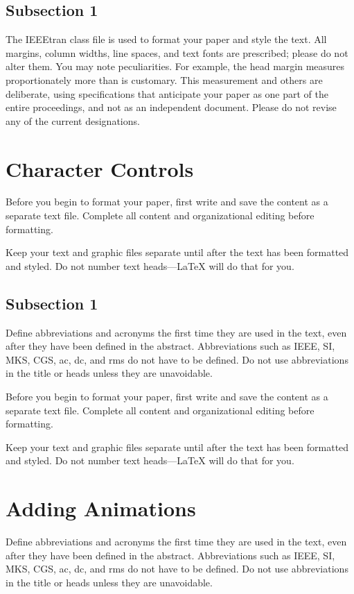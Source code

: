 \documentclass[conference]{IEEEtran}
\begin{document}
\subsection{Subsection 1}

The IEEEtran class file is used to format your paper and style the text. All margins, 
column widths, line spaces, and text fonts are prescribed; please do not 
alter them. You may note peculiarities. For example, the head margin
measures proportionately more than is customary. This measurement 
and others are deliberate, using specifications that anticipate your paper 
as one part of the entire proceedings, and not as an independent document. 
Please do not revise any of the current designations.

\section{Character Controls}
Before you begin to format your paper, first write and save the content as a 
separate text file. Complete all content and organizational editing before 
formatting. 

Keep your text and graphic files separate until after the text has been 
formatted and styled. Do not number text heads---{\LaTeX} will do that 
for you.

\subsection{Subsection 1}
Define abbreviations and acronyms the first time they are used in the text, 
even after they have been defined in the abstract. Abbreviations such as 
IEEE, SI, MKS, CGS, ac, dc, and rms do not have to be defined. Do not use 
abbreviations in the title or heads unless they are unavoidable.


Before you begin to format your paper, first write and save the content as a 
separate text file. Complete all content and organizational editing before 
formatting. 

Keep your text and graphic files separate until after the text has been 
formatted and styled. Do not number text heads---{\LaTeX} will do that 
for you.

\section{Adding Animations}
Define abbreviations and acronyms the first time they are used in the text, 
even after they have been defined in the abstract. Abbreviations such as 
IEEE, SI, MKS, CGS, ac, dc, and rms do not have to be defined. Do not use 
abbreviations in the title or heads unless they are unavoidable.
\end{document}
